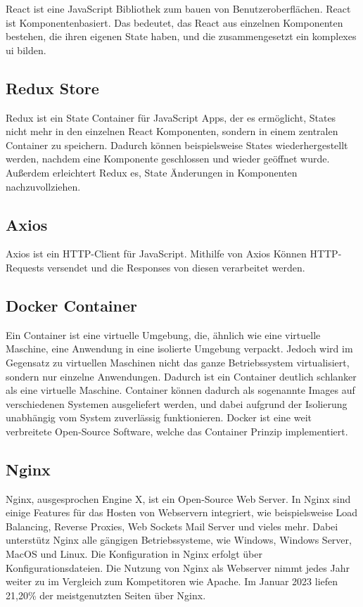React ist eine JavaScript Bibliothek zum bauen von Benutzeroberflächen.
React ist Komponentenbasiert.
Das bedeutet, das React aus einzelnen Komponenten bestehen, die ihren eigenen State haben, und die zusammengesetzt ein komplexes \ac{ui} bilden.
~\autocite{banks:react}


\subsection{Redux Store}
\label{sub:redux}

Redux ist ein State Container für JavaScript Apps, der es ermöglicht, States nicht mehr in den einzelnen React Komponenten, sondern in einem zentralen Container zu speichern.
Dadurch können beispielsweise States wiederhergestellt werden, nachdem eine Komponente geschlossen und wieder geöffnet wurde.
Außerdem erleichtert Redux es, State Änderungen in Komponenten nachzuvollziehen.
~\autocite{freecodecamp:redux}

\subsection{Axios}
\label{sub:axios}

Axios ist ein HTTP-Client für JavaScript.
Mithilfe von Axios Können HTTP-Requests versendet und die Responses von diesen verarbeitet werden.

\subsection{Docker Container}
\label{sub:docker}

Ein Container ist eine virtuelle Umgebung, die, ähnlich wie eine virtuelle Maschine, eine Anwendung in eine isolierte Umgebung verpackt.
Jedoch wird im Gegensatz zu virtuellen Maschinen nicht das ganze Betriebssystem virtualisiert, sondern nur einzelne Anwendungen.
Dadurch ist ein Container deutlich schlanker als eine virtuelle Maschine.
Container können dadurch als sogenannte Images auf verschiedenen Systemen ausgeliefert werden, und dabei aufgrund der Isolierung unabhängig vom System zuverlässig funktionieren.
Docker ist eine weit verbreitete Open-Source Software, welche das Container Prinzip implementiert.
~\autocite{devInsider:container}

\subsection{Nginx}
\label{sub:nginx}

Nginx, ausgesprochen Engine X, ist ein Open-Source Web Server.
In Nginx sind einige Features für das Hosten von Webservern integriert, wie beispielsweise Load Balancing, Reverse Proxies, Web Sockets Mail Server und vieles mehr.
Dabei unterstütz Nginx alle gängigen Betriebssysteme, wie Windows, Windows Server, MacOS und Linux.
Die Konfiguration in Nginx erfolgt über Konfigurationsdateien.
Die Nutzung von Nginx als Webserver nimmt jedes Jahr weiter zu im Vergleich zum Kompetitoren wie Apache.
Im Januar 2023 liefen 21,20\% der meistgenutzten Seiten über Nginx.
~\autocite{nginx:nginx}
